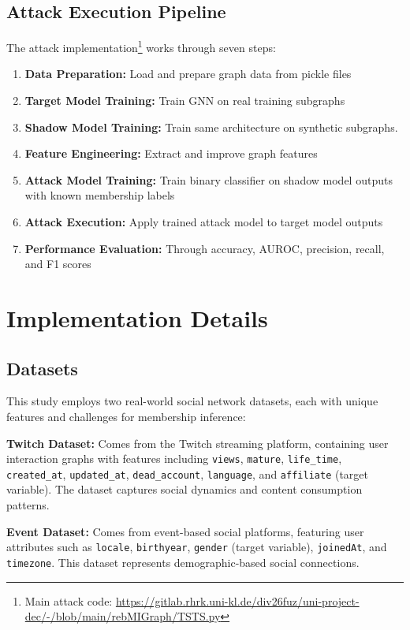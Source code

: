 \documentclass{article}
\begin{document}
\subsection{Attack Execution Pipeline}
The attack implementation\footnote{Main attack code: \url{https://gitlab.rhrk.uni-kl.de/div26fuz/uni-project-dec/-/blob/main/rebMIGraph/TSTS.py}} works through seven steps:
\begin{enumerate}
\item \textbf{Data Preparation:} Load and prepare graph data from pickle files
\item \textbf{Target Model Training:} Train GNN on real training subgraphs
\item \textbf{Shadow Model Training:} Train same architecture on synthetic subgraphs.
\item \textbf{Feature Engineering:} Extract and improve graph features
\item \textbf{Attack Model Training:} Train binary classifier on shadow model outputs with known membership labels
\item \textbf{Attack Execution:} Apply trained attack model to target model outputs
\item \textbf{Performance Evaluation:} Through accuracy, AUROC, precision, recall, and F1 scores
\end{enumerate}

\section{Implementation Details}
\subsection{Datasets}
This study employs two real-world social network datasets, each with unique features and challenges for membership inference:

\textbf{Twitch Dataset:} Comes from the Twitch streaming platform, containing user interaction graphs with features including \texttt{views}, \texttt{mature}, \texttt{life\_time}, \texttt{created\_at}, \texttt{updated\_at}, \texttt{dead\_account}, \texttt{language}, and \texttt{affiliate} (target variable). The dataset captures social dynamics and content consumption patterns.

\textbf{Event Dataset:} Comes from event-based social platforms, featuring user attributes such as \texttt{locale}, \texttt{birthyear}, \texttt{gender} (target variable), \texttt{joinedAt}, and \texttt{timezone}. This dataset represents demographic-based social connections.
\end{document}
